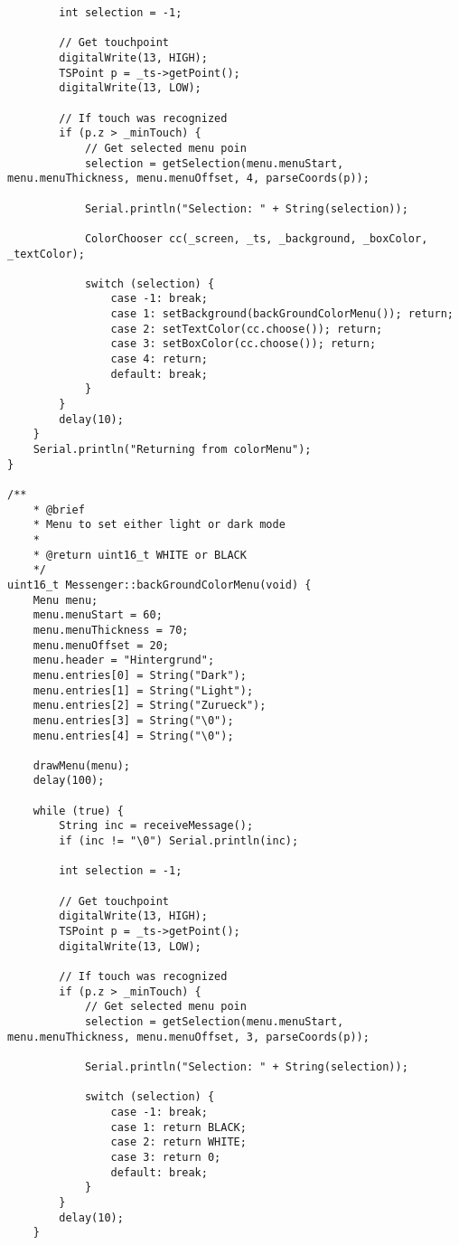 \documentclass[a4paper, 11pt]{scrartcl}
\begin{document}
\begin{lstlisting}
        int selection = -1;
        
        // Get touchpoint
        digitalWrite(13, HIGH);
        TSPoint p = _ts->getPoint();
        digitalWrite(13, LOW);

        // If touch was recognized
        if (p.z > _minTouch) {
            // Get selected menu poin
            selection = getSelection(menu.menuStart, menu.menuThickness, menu.menuOffset, 4, parseCoords(p));

            Serial.println("Selection: " + String(selection));
            
            ColorChooser cc(_screen, _ts, _background, _boxColor, _textColor);

            switch (selection) {
                case -1: break;
                case 1: setBackground(backGroundColorMenu()); return;
                case 2: setTextColor(cc.choose()); return;
                case 3: setBoxColor(cc.choose()); return;
                case 4: return;
                default: break;
            }
        }
        delay(10);
    }
    Serial.println("Returning from colorMenu");
}

/**
    * @brief 
    * Menu to set either light or dark mode
    * 
    * @return uint16_t WHITE or BLACK
    */
uint16_t Messenger::backGroundColorMenu(void) {
    Menu menu;
    menu.menuStart = 60;
    menu.menuThickness = 70;
    menu.menuOffset = 20;
    menu.header = "Hintergrund";
    menu.entries[0] = String("Dark");
    menu.entries[1] = String("Light");
    menu.entries[2] = String("Zurueck");
    menu.entries[3] = String("\0");
    menu.entries[4] = String("\0");

    drawMenu(menu);
    delay(100);

    while (true) {
        String inc = receiveMessage();
        if (inc != "\0") Serial.println(inc);
        
        int selection = -1;
        
        // Get touchpoint
        digitalWrite(13, HIGH);
        TSPoint p = _ts->getPoint();
        digitalWrite(13, LOW);

        // If touch was recognized
        if (p.z > _minTouch) {
            // Get selected menu poin
            selection = getSelection(menu.menuStart, menu.menuThickness, menu.menuOffset, 3, parseCoords(p));

            Serial.println("Selection: " + String(selection));
            
            switch (selection) {
                case -1: break;
                case 1: return BLACK;
                case 2: return WHITE; 
                case 3: return 0;
                default: break;
            }
        }
        delay(10);
    }


\end{lstlisting}
\end{document}
